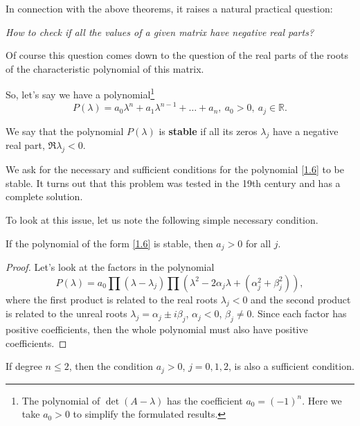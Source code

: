 In connection with the above theorems, it raises a natural practical question:

\emph{How to check if all the values of a given matrix have negative real parts?}

Of course this question comes down to the question of the real parts of the roots of the characteristic polynomial of this matrix.

So, let's say we have a polynomial\footnote{The polynomial of $\det(A-\lambda)$ has the coefficient $a_0 = (-1)^n$. Here we take $a_0>0$ to simplify the formulated results.}
\begin{equation}\label{1.6}
	P(\lambda) = a_0\lambda^n + a_1\lambda^{n-1} +  \ldots + a_n, \ a_0>0, \ a_j\in \mathbb{R}.
\end{equation}

\begin{definition}
	We say that the polynomial $P (\lambda)$ is \textbf{stable} if all its zeros $\lambda_j$ have a negative real part, $\Re \lambda_j <0$.
\end{definition}

We ask for the necessary and sufficient conditions for the polynomial \eqref{1.6} to be stable. It turns out that this problem was tested in the 19th century and has a complete solution.

To look at this issue, let us note the following simple necessary condition.

\begin{lemma}
	If the polynomial of the form \eqref{1.6} is stable, then $a_j > 0$ for all $j$.
	\begin{proof}
		Let's look at the factors in the polynomial
		$$P(\lambda) = a_0 \prod (\lambda - \lambda_j) \prod (\lambda^2 -2\alpha_j \lambda + (\alpha_j^2 +\beta_j^2)),$$
		where the first product is related to the real roots $\lambda_j <0$ and the second product is related to the unreal roots $\lambda_j = \alpha_j \pm i\beta_j$, $\alpha_j < 0$, $\beta_j \neq 0$. Since each factor has positive coefficients, then the whole polynomial must also have positive coefficients.
	\end{proof}
\end{lemma}

\begin{remark}\label{remark:1.12}
	If degree $n\leq 2$, then the condition $a_j> 0$, $j = 0, 1, 2$, is also a sufficient condition.
\end{remark}

